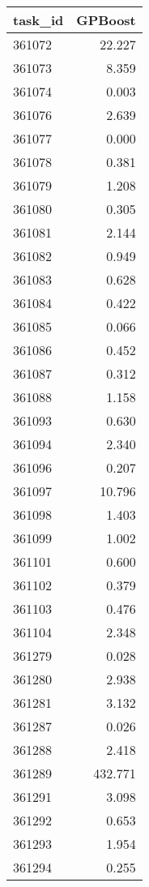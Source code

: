 \begin{tabular}{lr}
\toprule
task\_id & GPBoost \\
\midrule
361072 & 22.227 \\
361073 & 8.359 \\
361074 & 0.003 \\
361076 & 2.639 \\
361077 & 0.000 \\
361078 & 0.381 \\
361079 & 1.208 \\
361080 & 0.305 \\
361081 & 2.144 \\
361082 & 0.949 \\
361083 & 0.628 \\
361084 & 0.422 \\
361085 & 0.066 \\
361086 & 0.452 \\
361087 & 0.312 \\
361088 & 1.158 \\
361093 & 0.630 \\
361094 & 2.340 \\
361096 & 0.207 \\
361097 & 10.796 \\
361098 & 1.403 \\
361099 & 1.002 \\
361101 & 0.600 \\
361102 & 0.379 \\
361103 & 0.476 \\
361104 & 2.348 \\
361279 & 0.028 \\
361280 & 2.938 \\
361281 & 3.132 \\
361287 & 0.026 \\
361288 & 2.418 \\
361289 & 432.771 \\
361291 & 3.098 \\
361292 & 0.653 \\
361293 & 1.954 \\
361294 & 0.255 \\
\bottomrule
\end{tabular}
